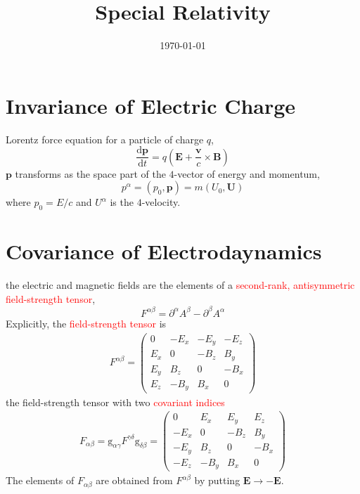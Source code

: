 \documentclass[12pt,a4paper]{article}
\title{Special Relativity}
\author{}
\date{\today}
\renewcommand{\vec}[1]{\boldsymbol{#1}}
\newcommand{\dif}{\mathrm{d}}
\renewcommand{\arraystretch}{1.5}
\begin{document}
\maketitle


\section{Invariance of Electric Charge}
Lorentz force equation for a particle of charge $q$,
\begin{equation}
\frac{\dif \vec{p}}{\dif t} = q\left(\vec{E} +\frac{\vec{v}}{c} \times \vec{B} \right)
\end{equation}
$\vec{p}$ transforms as the space part of the $4$-vector of energy and momentum, 
\begin{equation*}
p^\alpha = (p_0, \vec{p}) = m (U_0, \vec{U})
\end{equation*}
where $p_0 = E/c$ and $U^\alpha$ is the $4$-velocity. 

\section{Covariance of Electrodaynamics}
the electric and magnetic fields are the elements of a \textcolor{red}{second-rank, antisymmetric field-strength tensor},
\begin{equation}
F^{\alpha \beta} = \partial^{\alpha} A^{\beta} -\partial^{\beta} A^{\alpha}
\end{equation}
Explicitly, the \textcolor{red}{field-strength tensor} is 
\renewcommand{\arraystretch}{1}
\begin{gather*}
F^{\alpha \beta} = 
\begin{pmatrix} 
0 &-E_x  &-E_y &-E_z \\
E_x &0 &-B_z &B_y \\
E_y &B_z &0 &-B_x \\
E_z &-B_y &B_x &0
\end{pmatrix}
\end{gather*}
\renewcommand{\arraystretch}{1.5}
the field-strength tensor with two \textcolor{red}{covariant indices}
\renewcommand{\arraystretch}{1}
\begin{gather*}
F_{\alpha \beta} = \mathrm{g}_{\alpha \gamma} F^{\gamma \delta} \mathrm{g}_{\delta \beta} =
\begin{pmatrix} 
0 &E_x  &E_y &E_z \\
-E_x &0 &-B_z &B_y \\
-E_y &B_z &0 &-B_x \\
-E_z &-B_y &B_x &0
\end{pmatrix}
\end{gather*}
\renewcommand{\arraystretch}{1.5}
The elements of $F_{\alpha \beta}$ are obtained from $F^{\alpha \beta}$ by putting $\vec{E} \rightarrow -\vec{E}$.
\end{document}
